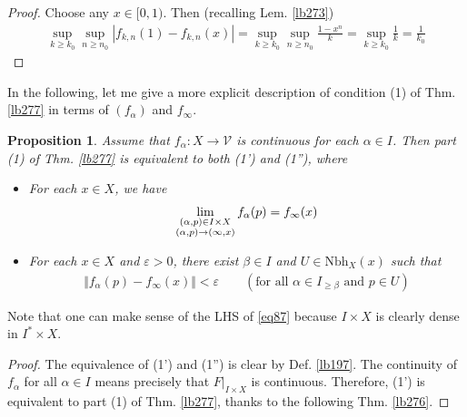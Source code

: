 \documentclass[12pt,b5paper,notitlepage]{article}
\theoremstyle{definition}
\theoremstyle{plain}
\newtheorem{pp}[df]{Proposition}
\newcommand{\mc}{\mathcal}
\newcommand{\Nbh}{\mathrm{Nbh}}
\newcommand{\eps}{\varepsilon}
\numberwithin{equation}{section}
\begin{document}
\begin{proof}
Choose any $x\in[0,1)$. Then (recalling Lem. \ref{lb273})
\begin{align*}
\sup_{k\geq k_0}\sup_{n\geq n_0}|f_{k,n}(1)-f_{k,n}(x)|=\sup_{k\geq k_0}\sup_{n\geq n_0}\frac{1-x^n}{k}=\sup_{k\geq k_0}\frac 1k=\frac 1{k_0}
\end{align*}
\end{proof}



In the following, let me give a more explicit description of condition (1) of Thm. \ref{lb277} in terms of $(f_\alpha)$ and $f_\infty$. 


\begin{pp}\label{lb281}
Assume that $f_\alpha:X\rightarrow\mc V$ is continuous for each $\alpha\in I$. Then part (1) of Thm. \ref{lb277} is equivalent to both (1') and (1''), where
\begin{itemize}
\item[(1')] For each $x\in X$, we have 
\begin{align}\label{eq87}
\lim_{
\begin{subarray}{c}
(\alpha,p)\in I\times X\\
(\alpha,p)\rightarrow (\infty,x)
\end{subarray}
}
f_\alpha(p)=f_\infty(x)
\end{align}
\item[(1'')] For each $x\in X$ and $\eps>0$, there exist $\beta\in I$ and $U\in\Nbh_X(x)$ such that 
\begin{align}\label{eq79}
\Vert f_\alpha(p)-f_\infty(x)\Vert<\eps\qquad (\text{for all } \alpha\in I_{\geq\beta}\text{ and } p\in U)
\end{align}
\end{itemize}
\end{pp}

Note that one can make sense of the LHS of \eqref{eq87} because $I\times X$ is clearly dense in $I^*\times X$. %

\begin{proof}
The equivalence of (1') and (1'') is clear by Def. \ref{lb197}. The continuity of $f_\alpha$ for all $\alpha\in I$ means precisely that $F|_{I\times X}$ is continuous. Therefore, (1') is equivalent to part (1) of Thm. \ref{lb277}, thanks to the following Thm. \ref{lb276}.
\end{proof}
\end{document}

